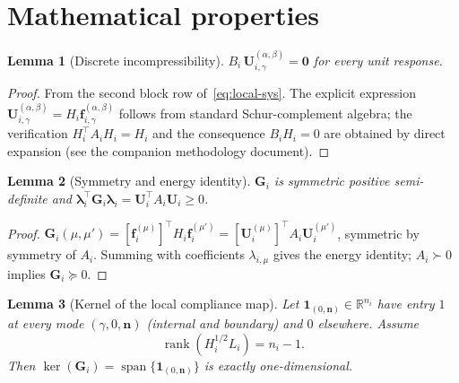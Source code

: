 \documentclass[11pt,a4paper]{article}
\newtheorem{lemma}{Lemma}[section]
\newcommand{\R}{\mathbb{R}}
\newcommand{\normal}{\bm{n}}
\newcommand{\trac}{\bm{\lambda}}
\newcommand{\DtN}{\mathbf{G}}
\newcommand{\one}{\mathbf{1}}
\newcommand{\loadvec}{\bm{f}}
\newcommand{\respvel}{\mathbf{U}}
\begin{document}
\section{Mathematical properties}

\begin{lemma}[Discrete incompressibility]\label{lem:incomp}
  $B_i\,\respvel_{i,\gamma}^{(\alpha,\beta)} = \bm{0}$
  for every unit response.
\end{lemma}

\begin{proof}
  From the second block row of~\eqref{eq:local-sys}.
  The explicit expression $\respvel_{i,\gamma}^{(\alpha,\beta)}
  = H_i \loadvec_{i,\gamma}^{(\alpha,\beta)}$ follows from standard
  Schur-complement algebra; the verification $H_i^\top A_i H_i = H_i$
  and the consequence $B_i H_i = 0$ are obtained by direct expansion
  (see the companion methodology document).
\end{proof}


\begin{lemma}[Symmetry and energy identity]\label{lem:sym}
  $\DtN_i$ is symmetric positive semi-definite and
  $\trac_i^\top \DtN_i \trac_i
   = \respvel_i^\top A_i \respvel_i \ge 0$.
\end{lemma}

\begin{proof}
  $\DtN_i(\mu,\mu') = [\loadvec_i^{(\mu)}]^\top H_i \loadvec_i^{(\mu')}
   = [\respvel_i^{(\mu)}]^\top A_i \respvel_i^{(\mu')}$,
  symmetric by symmetry of $A_i$.
  Summing with coefficients $\lambda_{i,\mu}$ gives the energy identity;
  $A_i \succ 0$ implies $\DtN_i \succeq 0$.
\end{proof}


\begin{lemma}[Kernel of the local compliance map]\label{lem:kernel}
  Let $\one_{(0,\normal)} \in \R^{n_i}$ have entry $1$ at every
  mode $(\gamma,0,\normal)$ (internal and boundary) and $0$ elsewhere.
  Assume
  \begin{equation}\label{eq:rank-assumption}
    \operatorname{rank}(H_i^{1/2} L_i) = n_i - 1.
  \end{equation}
  Then $\ker(\DtN_i) = \operatorname{span}\{\one_{(0,\normal)}\}$
  is exactly one-dimensional.
\end{lemma}
\end{document}
